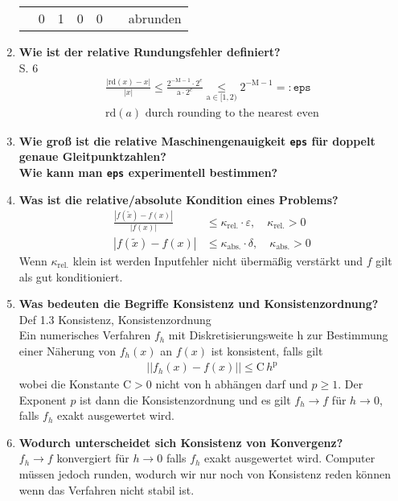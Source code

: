 \begin{enumerate}
\begin{table}[htbp]
\begin{tabular}[htpb]{ccccccl}
				      & 0                   & 1                       & 0                       & 0         &       & abrunden
			\end{tabular}
		\end{table}
		\item \textbf{Wie ist der relative Rundungsfehler definiert?} \\
		S. 6
		\begin{align*}
			\frac{|\text{rd}(x)-x|}{|x|}\leq \frac{2^{-\text{M}-1}\cdot2^e}{\text{a}\cdot 2^e}\underset{\text{a}\in[1,2)}{\leq}2^{-\text{M}-1}=:\texttt{eps} \\
			\text{rd}(a) \text{ durch rounding to the nearest even} 
		\end{align*}
		
		\item \textbf{Wie groß ist die relative Maschinengenauigkeit \texttt{eps} für doppelt genaue Gleitpunktzahlen?\\
					Wie kann man \texttt{eps} experimentell bestimmen?} \\
				
				
		\item \textbf{Was ist die relative/absolute Kondition eines Problems?} \\
			\begin{align*}
				\frac{|f(\tilde{x})-f(x)|}{|f(x)|} &\leq \kappa_{\text{rel.}}\cdot\varepsilon, \quad \kappa_{\text{rel.}} > 0 \\
				|f(\tilde{x})-f(x)| &\leq \kappa_{\text{abs.}}\cdot\delta, \quad \kappa_{\text{abs.}} > 0
			\end{align*}
		Wenn $\kappa_{\text{rel.}}$ klein ist werden Inputfehler nicht übermäßig verstärkt und $f$ gilt als gut konditioniert.
		\item \textbf{Was bedeuten die Begriffe Konsistenz und Konsistenzordnung?} \\
			Def 1.3 Konsistenz, Konsistenzordnung \\
			Ein numerisches Verfahren $f_h$ mit Diskretisierungsweite h zur Bestimmung einer Näherung von $f_h(x)$ an $f(x)$ ist konsistent, falls gilt
			\begin{align*}
				||f_h(x)-f(x)||\leq \text{C}\,h^\text{p}
			\end{align*}
			wobei die Konstante $\text{C}>0$ nicht von h abhängen darf und $p\ge1$. Der Exponent $p$ ist dann die Konsistenzordnung und es gilt $f_h\rightarrow f$ für $ h \rightarrow 0$, falls $f_h$ exakt ausgewertet wird. 
		
		\item \textbf{Wodurch unterscheidet sich Konsistenz von Konvergenz?} \\
			$f_h\rightarrow f$ konvergiert für $ h \rightarrow 0$ falls $f_h$ exakt ausgewertet wird. Computer müssen jedoch runden, wodurch wir nur noch von Konsistenz reden können wenn das Verfahren nicht stabil ist.
		

\end{enumerate}
